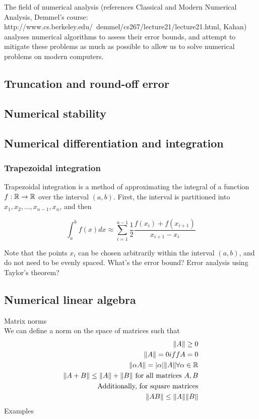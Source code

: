 \documentclass{amsart}[12pt]
\newcommand{\mgc}[1]{{\color{blue}#1}}
\begin{document}
The field of numerical analysis (references Classical and Modern Numerical Analysis,
Demmel's course: http://www.cs.berkeley.edu/~demmel/cs267/lecture21/lecture21.html, Kahan) analyses numerical 
algorithms to assess their error bounds, and attempt to mitigate these problems as much as possible to allow
us to solve numerical problems on modern computers.

\subsection{Truncation and round-off error}
\subsection{Numerical stability}
\subsection{Numerical differentiation and integration}
\subsubsection{Trapezoidal integration}

Trapezoidal integration is a method of approximating the integral of a function $f: {\mathbb{R}} \to {\mathbb{R}}$ over the
interval $(a, b)$. First, the interval is partitioned into $x_1, x_2, \ldots, x_{n-1}, x_n$, and then

\[
	\int_a^b f(x) dx \approx \sum_{i=1}^{n-1} \frac{1}{2} \frac{f(x_i) + f(x_{i+1})}{x_{i+1} - x_i}
\]

Note that the points $x_i$ can be chosen arbitrarily within the interval $(a, b)$, and do not need to be
evenly spaced. \mgc{What's the error bound? Error analysis using Taylor's theorem?}

\subsection{Numerical linear algebra}
Matrix norms \\
We can define a norm on the space of matrices such that
\begin{align*}
\|A\| \geq 0 \\
\|A\| = 0 iff A = 0 \\
\|\alpha A\| = |\alpha| \|A\| \forall \alpha \in {\mathbb{R}} \\
\|A + B\| \leq \|A\| + \|B\|\text{ for all matrices } A, B \\
\text{Additionally, for square matrices} \\
\|AB\| \leq \|A\| \|B\| \\
\end{align*}
Examples
\end{document}

